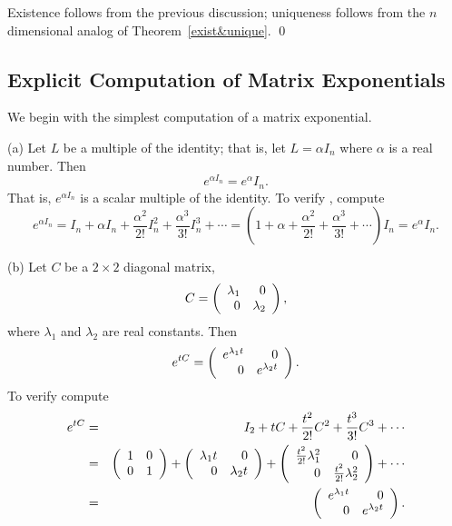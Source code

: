 \proof  Existence follows from the previous discussion;
uniqueness follows from the $n$ dimensional analog of
Theorem~\ref{exist&unique}.  \qed


\subsection*{Explicit Computation of Matrix Exponentials}

We begin with the simplest computation of a matrix exponential.

\noindent (a) \quad Let $L$ be a multiple of the identity; that
is, let $L = \alpha I_n$ where $\alpha$ is a real number.  Then
\begin{equation} \label{ex:expm}
e^{\alpha I_n} = e^{\alpha} I_n.
\end{equation}
That is, $e^{\alpha I_n}$ is a scalar multiple of the
identity.  To verify , compute
\[
e^{\alpha I_n} = I_n + \alpha I_n + \frac{\alpha^2}{2!} I_n^2 +
\frac{\alpha^3}{3!} I_n^3 +\cdots = (1+\alpha+\frac{\alpha^2}{2!}
+\frac{\alpha^3}{3!}+\cdots)I_n = e^{\alpha} I_n.
\]

\noindent (b) \quad Let $C$ be a $2\times 2$ diagonal matrix,
     \[
          C = \left(\begin{array}{rr} \lambda_1 & 0\\ 0 &\lambda_2\end{array}\right),
     \]
where $\lambda_1$ and $\lambda_2$ are real constants.  Then
\begin{equation}  \label{e:expdiag}
e^{tC} = \left(\begin{array}{rr} e^{\lambda_1 t} & 0\\ 0 &e^{\lambda_2 t}\end{array}\right).
\end{equation}
To verify  compute
\begin{eqnarray*}
   e^{tC} & = & I_2 + tC + \frac{t^2}{2!} C^2 +  \frac{t^3}{3!} C^3 +\cdots\\
        & = & \left(\begin{array}{rr} 1 & 0\\ 0 &1\end{array}\right) + \left(\begin{array}{rr} \lambda_1 t & 0\\ 0 &\lambda_2 t\end{array}\right) +
\left(\begin{array}{rr} \frac{t^2}{2!}\lambda_1^2 & 0\\ 0 &\frac{t^2}{2!}\lambda_2^2\end{array}\right) +\cdots\\
        & = & \left(\begin{array}{rr} e^{\lambda_1 t} & 0\\ 0 &e^{\lambda_2 t}\end{array}\right).
\end{eqnarray*}

